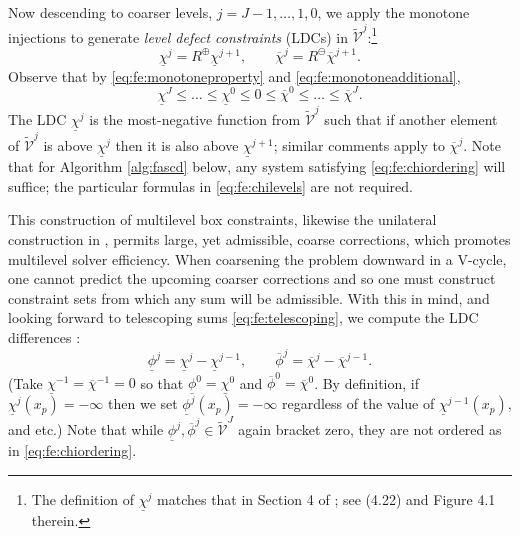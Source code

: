 \documentclass[review,hidelinks,onefignum,onetabnum,final]{siamart220329}  %
\newcommand{\maxR}{R^{\bm{\oplus}}}
\newcommand{\minR}{R^{\bm{\ominus}}}
\begin{document}
Now descending to coarser levels, $j=J-1,\dots,1,0$, we apply the monotone injections to generate \emph{level defect constraints} (LDCs) in $\tilde{\mathcal{V}}^j$:\footnote{The definition of $\underline{\chi}^j$ matches that in Section 4 of \cite{GraeserKornhuber2009}; see (4.22) and Figure 4.1 therein.}
\begin{equation}
\underline{\chi}^{j} = \maxR \underline{\chi}^{j+1}, \qquad \overline{\chi}^{j} = \minR \overline{\chi}^{j+1}. \label{eq:fe:chilevels}
\end{equation}
Observe that by \eqref{eq:fe:monotoneproperty} and \eqref{eq:fe:monotoneadditional},
\begin{equation}
\underline{\chi}^{J} \le \dots \le \underline{\chi}^0 \le 0 \le \overline{\chi}^0 \le \dots \le \overline{\chi}^J. \label{eq:fe:chiordering}
\end{equation}
The LDC $\underline{\chi}^j$ is the most-negative function from $\tilde{\mathcal{V}}^j$ such that if another element of $\tilde{\mathcal{V}}^j$ is above $\underline{\chi}^j$ then it is also above $\underline{\chi}^{j+1}$; similar comments apply to $\overline{\chi}^{j}$.  Note that for Algorithm \ref{alg:fascd} below, any system satisfying \eqref{eq:fe:chiordering} will suffice; the particular formulas in \eqref{eq:fe:chilevels} are not required.

This construction of multilevel box constraints, likewise the unilateral construction in \cite{GraeserKornhuber2009}, permits large, yet admissible, coarse corrections, which promotes multilevel solver efficiency.  When coarsening the problem downward in a V-cycle, one cannot predict the upcoming coarser corrections and so one must construct constraint sets from which any sum will be admissible.  With this in mind, and looking forward to telescoping sums \eqref{eq:fe:telescoping}, we compute the LDC differences \cite{GraeserKornhuber2009}:
\begin{equation}
\underline{\phi}^j = \underline{\chi}^j - \underline{\chi}^{j-1}, \qquad \overline{\phi}^j = \overline{\chi}^j - \overline{\chi}^{j-1}.  \label{eq:fe:philevels}
\end{equation}
(Take $\underline{\chi}^{-1}=\overline{\chi}^{-1}=0$ so that $\underline{\phi}^0=\underline{\chi}^0$ and $\overline{\phi}^0=\overline{\chi}^0$.  By definition, if $\underline{\chi}^j(x_p)=-\infty$ then we set $\underline{\phi}^j(x_p)=-\infty$ regardless of the value of $\underline{\chi}^{j-1}(x_p)$, and etc.)  Note that while $\underline{\phi}^{j},\overline{\phi}^{j} \in \tilde{\mathcal{V}}^J$ again bracket zero, they are not ordered as in \eqref{eq:fe:chiordering}.
\end{document}
